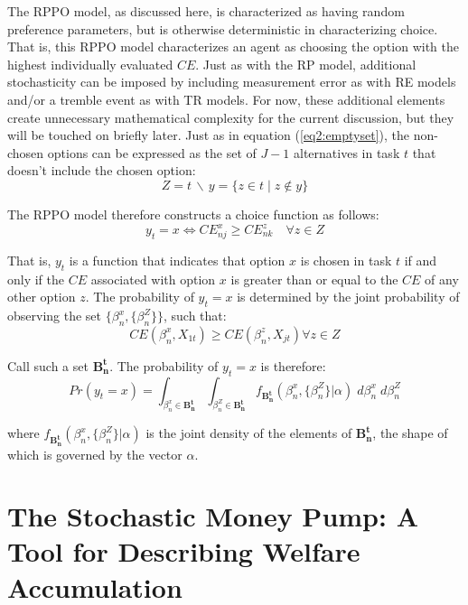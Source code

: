 \documentclass[11pt,a4paper]{report}
\newcommand\CE{\ensuremath{\mathit{CE}}}    %
\newcommand\Prob{\ensuremath{\mathit{Pr}}}  %
\begin{document}
The RPPO model, as discussed here, is characterized as having random preference parameters, but is otherwise deterministic in characterizing choice.
That is, this RPPO model characterizes an agent as choosing the option with the highest individually evaluated {\CE}.
Just as with the RP model, additional stochasticity can be imposed by including measurement error as with RE models and/or a tremble event as with TR models.
For now, these additional elements create unnecessary mathematical complexity for the current discussion, but they will be touched on briefly later.
Just as in equation (\ref{eq2:emptyset}), the non-chosen options can be expressed as the set of $J-1$ alternatives in task $t$ that doesn't include the chosen option:
\begin{equation}
	\label{eq2:RPPO:emptyset}
	Z = t \,\backslash\, y = \{z \in t \;|\; z \notin y \}
\end{equation}


\noindent The RPPO model therefore constructs a choice function as follows:
\begin{equation}
	\label{RPPO.y0}
	y_t = x \Leftrightarrow {\CE}_{nj}^x \geq {\CE}_{nk}^z \quad \forall z \in Z
\end{equation}

That is, $y_t$ is a function that indicates that option $x$ is chosen in task $t$ if and only if the {\CE} associated with option $x$ is greater than or equal to the {\CE} of any other option $z$.
The probability of $y_t = x$ is determined by the joint probability of observing the set $\bigl\{\beta_n^x,\{\beta_n^Z\}\bigr\}$, such that:
\begin{equation}
	\label{eq2:RPPO.y1}
	{\CE}(\beta_n^x,X_{1t}) \geq {\CE}(\beta_n^z,X_{jt}) \forall z \in Z
\end{equation}

\noindent Call such a set $\mathbf{B^t_n}$.
The probability of $y_t=x$ is therefore:
\begin{equation}
	{\Prob}(y_t=x) = \int_{\beta_n^x \in \mathbf{B^t_n}}\int_{\beta_n^Z \in \mathbf{B^t_n}} f_{\mathbf{B^t_n}}\!\left(\beta_n^x,\{\beta_n^Z\}|\alpha\right) \;d\beta_n^x \; d\beta_n^Z
\end{equation}

\noindent where $f_{\mathbf{B^t_n}}(\beta_n^x,\{\beta_n^Z\}|\alpha)$ is the joint density of the elements of $\mathbf{B^t_n}$, the shape of which is governed by the vector $\alpha$.

\section[The Stochastic Money Pump: A Tool for Describing Welfare \texorpdfstring{\\}{}Accumulation]{The Stochastic Money Pump: A Tool for Describing Welfare\\Accumulation}
\end{document}
